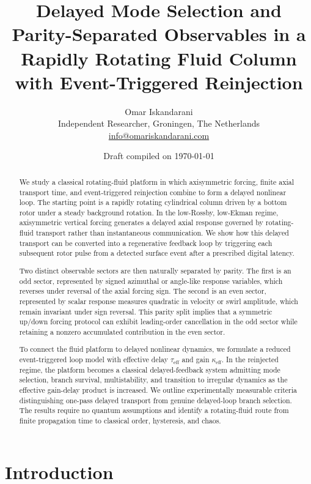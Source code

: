 \documentclass[11pt,a4paper]{article}
\title{Delayed Mode Selection and Parity-Separated Observables in a Rapidly Rotating Fluid Column with Event-Triggered Reinjection}
\author{Omar Iskandarani\\
\small Independent Researcher, Groningen, The Netherlands\\
\small \href{mailto:info@omariskandarani.com}{info@omariskandarani.com}}
\date{Draft compiled on \today}
\begin{document}
\maketitle

\begin{abstract}
We study a classical rotating-fluid platform in which axisymmetric forcing, finite axial transport time, and event-triggered reinjection combine to form a delayed nonlinear loop. The starting point is a rapidly rotating cylindrical column driven by a bottom rotor under a steady background rotation. In the low-Rossby, low-Ekman regime, axisymmetric vertical forcing generates a delayed axial response governed by rotating-fluid transport rather than instantaneous communication. We show how this delayed transport can be converted into a regenerative feedback loop by triggering each subsequent rotor pulse from a detected surface event after a prescribed digital latency.

Two distinct observable sectors are then naturally separated by parity. The first is an odd sector, represented by signed azimuthal or angle-like response variables, which reverses under reversal of the axial forcing sign. The second is an even sector, represented by scalar response measures quadratic in velocity or swirl amplitude, which remain invariant under sign reversal. This parity split implies that a symmetric up/down forcing protocol can exhibit leading-order cancellation in the odd sector while retaining a nonzero accumulated contribution in the even sector.

To connect the fluid platform to delayed nonlinear dynamics, we formulate a reduced event-triggered loop model with effective delay $\tau_{\mathrm{eff}}$ and gain $\kappa_{\mathrm{eff}}$. In the reinjected regime, the platform becomes a classical delayed-feedback system admitting mode selection, branch survival, multistability, and transition to irregular dynamics as the effective gain-delay product is increased. We outline experimentally measurable criteria distinguishing one-pass delayed transport from genuine delayed-loop branch selection. The results require no quantum assumptions and identify a rotating-fluid route from finite propagation time to classical order, hysteresis, and chaos.
\end{abstract}

\section{Introduction}
\end{document}
